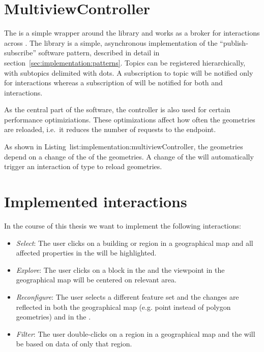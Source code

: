\section{MultiviewController}

The  is a simple wrapper around the library  and works as a broker for interactions across \cmvs{}.
The library  is a simple, asynchronous implementation of the ``publish-subscribe'' software pattern, described in detail in section~\ref{sec:implementation:patterns}.
Topics can be registered hierarchically, with subtopics delimited with dots.
A subscription to topic  will be notified only for  interactions whereas a subscription of  will be notified for both  and  interactions.

As the central part of the software, the controller is also used for certain performance optimiziations.
These optimizations affect how often the geometries are reloaded, i.e.\ it reduces the number of requests to the  endpoint.




As shown in Listing~{list:implementation:multiviewController}, the geometries depend on a change of the  of the geometries.
A change of the  will automatically trigger an interaction of type  to reload geometries.


\section{Implemented interactions}

In the course of this thesis we want to implement the following interactions:
\begin{itemize}
  \item
    \emph{Select}: The user clicks on a building or region in a geographical map and all affected properties in the \tmap{} will be highlighted.
  \item
    \emph{Explore}: The user clicks on a block in the \tmap{} and the viewpoint in the geographical map will be centered on relevant area.
  \item
    \emph{Reconfigure}: The user selects a different feature set and the changes are reflected in both the geographical map (e.g. point instead of polygon geometries) and in the \tmap{}.
  \item
    \emph{Filter}: The user double-clicks on a region in a geographical map and the \tmap{} will be based on data of only that region.
\end{itemize}

